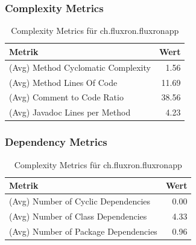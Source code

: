 \subsubsection{Complexity Metrics}

\begin{table}[H]
	\begin{center}
	  \begin{tabular}{ | l | r | }
	    \hline
	    \textbf{Metrik} & \textbf{Wert} \\ \hline
	    (Avg) Method Cyclomatic Complexity & 1.56 \\ \hline
  	    (Avg) Method Lines Of Code & 11.69 \\ \hline
  	    (Avg) Comment to Code Ratio & 38.56 \\ \hline
  	    (Avg) Javadoc Lines per Method & 4.23 \\ \hline
	  \end{tabular}
	  \caption{Complexity Metrics für ch.fluxron.fluxronapp}
  \end{center}
\end{table}

\subsubsection{Dependency Metrics}

\begin{table}[H]
	\begin{center}
	  \begin{tabular}{ | l | r | }
	    \hline
	    \textbf{Metrik} & \textbf{Wert} \\ \hline
	    (Avg) Number of Cyclic Dependencies & 0.00 \\ \hline
  	    (Avg) Number of Class Dependencies & 4.33 \\ \hline
  	    (Avg) Number of Package Dependencies & 0.96 \\ \hline
	  \end{tabular}
	  \caption{Complexity Metrics für ch.fluxron.fluxronapp}
  \end{center}
\end{table}